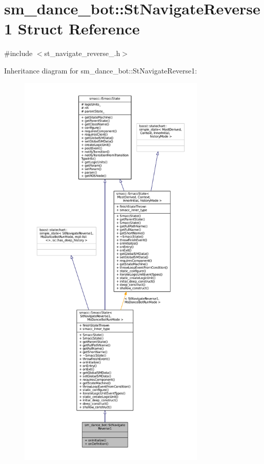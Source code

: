 \hypertarget{structsm__dance__bot_1_1StNavigateReverse1}{}\section{sm\+\_\+dance\+\_\+bot\+:\+:St\+Navigate\+Reverse1 Struct Reference}
\label{structsm__dance__bot_1_1StNavigateReverse1}


{\ttfamily \#include $<$st\+\_\+navigate\+\_\+reverse\+\_.\+h$>$}



Inheritance diagram for sm\+\_\+dance\+\_\+bot\+:\+:St\+Navigate\+Reverse1\+:
\nopagebreak
\begin{figure}[H]
\begin{center}
\leavevmode
\includegraphics[height=550pt]{structsm__dance__bot_1_1StNavigateReverse1__inherit__graph}
\end{center}
\end{figure}


